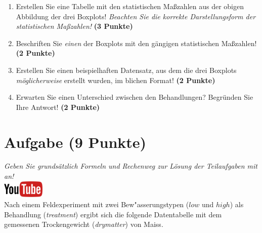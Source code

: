 \documentclass[a4paper, 9pt]{scrartcl}\usepackage[]{graphicx}\usepackage[]{xcolor}
\begin{document}
\begin{enumerate}
\item Erstellen Sie eine Tabelle mit den statistischen Ma{\ss}zahlen aus der
  obigen Abbildung der drei Boxplots! \textit{Beachten Sie die korrekte
    Darstellungsform der statistischen Ma{\ss}zahlen!} \textbf{(3 Punkte)}
\item Beschriften Sie \textit{einen} der Boxplots mit den g{\"a}ngigen
  statistischen Ma{\ss}zahlen! \textbf{(2 Punkte)}
\item Erstellen Sie einen beispielhaften Datensatz, aus dem die drei
  Boxplots \textit{m{\"o}glicherweise} erstellt wurden, im blichen Format! \textbf{(2 Punkte)}
\item Erwarten Sie einen Unterschied zwischen den Behandlungen? Begr{\"u}nden
  Sie Ihre Antwort! \textbf{(2 Punkte)}
\end{enumerate} 
\clearpage

\section{Aufgabe \hfill (9 Punkte)}

\textit{Geben Sie grunds{\"a}tzlich Formeln und Rechenweg zur L{\"o}sung der
  Teilaufgaben mit an!} \\[1Ex]

\hfill\href{https://youtu.be/0xc0jIPeiyw}{\includegraphics[width =
  2cm]{img/youtube}}\\[1Ex]



Nach einem Feldexperiment mit zwei Bew{"a}sserungstypen ($low$ und $high$) als Behandlung
(\textit{treatment}) ergibt sich die folgende Datentabelle mit dem
gemessenen Trockengewicht (\textit{drymatter}) von Maiss.
\end{document}
